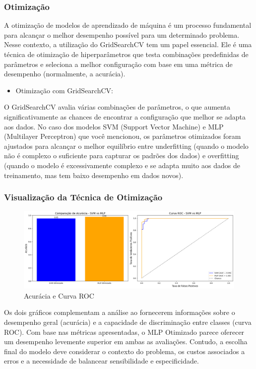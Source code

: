 \documentclass[12pt,a4paper,oneside,openany]{article}
\begin{document}
\subsubsection{Otimização}
\noindent A otimização de modelos de aprendizado de máquina é um processo fundamental para alcançar o melhor desempenho possível para um determinado problema. Nesse contexto, a utilização do GridSearchCV tem um papel essencial. Ele é uma técnica de otimização de hiperparâmetros que testa combinações predefinidas de parâmetros e seleciona a melhor configuração com base em uma métrica de desempenho (normalmente, a acurácia).

\begin{itemize}
    \item Otimização com GridSearchCV:
\end{itemize}

\noindent O GridSearchCV avalia várias combinações de parâmetros, o que aumenta significativamente as chances de encontrar a configuração que melhor se adapta aos dados. No caso dos modelos SVM (Support Vector Machine) e MLP (Multilayer Perceptron) que você mencionou, os parâmetros otimizados foram ajustados para alcançar o melhor equilíbrio entre underfitting (quando o modelo não é complexo o suficiente para capturar os padrões dos dados) e overfitting (quando o modelo é excessivamente complexo e se adapta muito aos dados de treinamento, mas tem baixo desempenho em dados novos).

\subsubsection{Visualização da Técnica de Otimização}

\begin{figure}[H]
    \centering
    \includegraphics[width=0.8\linewidth]{graficos/otimização_desempenho_curva_roc.png}
    \caption{Acurácia e Curva ROC}
    \label{fig:Acurácia e Curva ROC}
\end{figure}

\noindent
Os dois gráficos complementam a análise ao fornecerem informações sobre o desempenho geral (acurácia) e a capacidade de discriminação entre classes (curva ROC). Com base nas métricas apresentadas, o MLP Otimizado parece oferecer um desempenho levemente superior em ambas as avaliações. Contudo, a escolha final do modelo deve considerar o contexto do problema, os custos associados a erros e a necessidade de balancear sensibilidade e especificidade.
\end{document}
